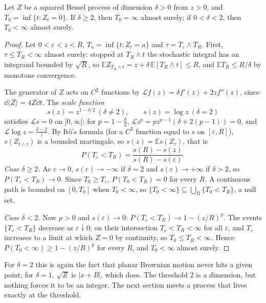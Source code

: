 \begin{theorem}\label{thm:besqzero}
Let $Z$ be a squared Bessel process of dimension $\delta>0$ from $z>0$, and $T_0=\inf\{t:Z_t=0\}$. If $\delta\ge2$, then $T_0=\infty$ almost surely; if $0<\delta<2$, then $T_0<\infty$ almost surely.
\end{theorem}

\begin{proof}
Let $0<\varepsilon<z<R$, $T_a=\inf\{t:Z_t=a\}$ and $\tau=T_\varepsilon\wedge T_R$. First, $\tau\le T_R<\infty$ almost surely: stopped at $T_R\wedge t$ the stochastic integral has an integrand bounded by $\sqrt R$, so
$\mathbb EZ_{T_R\wedge t}=z+\delta\,\mathbb E[T_R\wedge t]\le R$, and $\mathbb ET_R\le R/\delta$ by monotone convergence.

The generator of $Z$ acts on $C^2$ functions by $\mathcal Lf(z)=\delta f'(z)+2zf''(z)$, since $\dd\langle Z\rangle=4Z\dd t$. The \emph{scale function}
\[
s(z)=z^{1-\delta/2}\ (\delta\ne2),\qquad s(z)=\log z\ (\delta=2)
\]
satisfies $\mathcal Ls=0$ on $]0,\infty[$: for $p=1-\frac\delta2$, $\mathcal Lz^p=pz^{p-1}(\delta+2(p-1))=0$, and $\mathcal L\log z=\frac{\delta-2}z$. By It\^o's formula (for a $C^2$ function equal to $s$ on $[\varepsilon,R]$),
$s(Z_{t\wedge\tau})$ is a bounded martingale, so $s(z)=\mathbb Es(Z_\tau)$, that is
\[
P(T_\varepsilon<T_R)=\frac{s(R)-s(z)}{s(R)-s(\varepsilon)}.
\]
\emph{Case $\delta\ge2$.} As $\varepsilon\to0$, $s(\varepsilon)\to-\infty$ if $\delta=2$ and $s(\varepsilon)\to+\infty$ if $\delta>2$, so $P(T_\varepsilon<T_R)\to0$. Since $T_0\ge T_\varepsilon$, $P(T_0<T_R)=0$ for every $R$. A
continuous path is bounded on $[0,T_0]$ when $T_0<\infty$, so $\{T_0<\infty\}\subseteq\bigcup_R\{T_0<T_R\}$, a null set.

\emph{Case $\delta<2$.} Now $p>0$ and $s(\varepsilon)\to0$: $P(T_\varepsilon<T_R)\to1-(z/R)^p$. The events $\{T_\varepsilon<T_R\}$ decrease as $\varepsilon\downarrow0$; on their intersection $T_\varepsilon<T_R<\infty$ for all
$\varepsilon$, and $T_\varepsilon$ increases to a limit at which $Z=0$ by continuity, so $T_0\le T_R<\infty$. Hence $P(T_0<\infty)\ge1-(z/R)^p$ for every $R$, and $T_0<\infty$ almost surely.
\end{proof}

For $\delta=2$ this is again the fact that planar Brownian motion never hits a given point; for $\delta=1$, $\sqrt Z$ is $|x+B|$, which does. The threshold $2$ is a dimension, but nothing forces it to be an
integer. The next section meets a process that lives exactly at the threshold.

